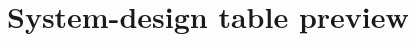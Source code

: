 \documentclass[11pt,a4paper]{article}
\begin{document}
\section{System-design table preview}

\end{document}
